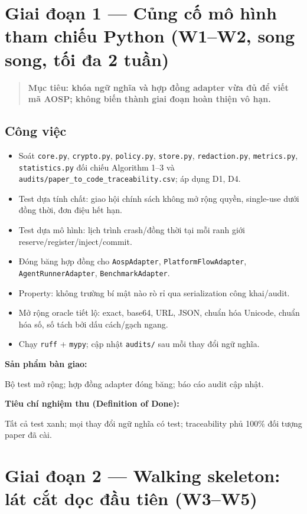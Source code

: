 \documentclass[11pt,a4paper]{article}
\newcommand{\code}[1]{\texttt{\small #1}}
\newenvironment{phasebox}
  {\begin{quote}\color{shblue}\bfseries}
  {\end{quote}}
\newcommand{\dod}[1]{\par\vspace{0.3em}\noindent\textbf{\color{shgreen}Tiêu chí nghiệm thu (Definition of Done):}\par\vspace{0.2em}\noindent #1}
\newcommand{\deliverable}[1]{\par\vspace{0.3em}\noindent\textbf{\color{shblue}Sản phẩm bàn giao:}\par\vspace{0.2em}\noindent #1}
\begin{document}
\section{Giai đoạn 1 --- Củng cố mô hình tham chiếu Python (W1--W2, song song, tối đa 2 tuần)}

\begin{phasebox}Mục tiêu: khóa ngữ nghĩa và hợp đồng adapter vừa đủ để viết mã AOSP; không biến thành giai đoạn hoàn thiện vô hạn.\end{phasebox}

\subsection{Công việc}

\begin{itemize}
  \item Soát \code{core.py}, \code{crypto.py}, \code{policy.py}, \code{store.py}, \code{redaction.py}, \code{metrics.py}, \code{statistics.py} đối chiếu Algorithm 1--3
        và \code{audits/paper\_to\_code\_traceability.csv}; áp dụng D1, D4.
  \item Test dựa tính chất: giao hội chính sách không mở rộng quyền, single-use dưới đồng thời, đơn điệu hết hạn.
  \item Test dựa mô hình: lịch trình crash/đồng thời tại mỗi ranh giới reserve/register/inject/commit.
  \item Đóng băng hợp đồng cho \code{Aosp\allowbreak Adapter}, \code{Platform\allowbreak Flow\allowbreak Adapter}, \code{Agent\allowbreak Runner\allowbreak Adapter}, \code{Benchmark\allowbreak Adapter}.
  \item Property: không trường bí mật nào rò rỉ qua serialization công khai/audit.
  \item Mở rộng oracle tiết lộ: exact, base64, URL, JSON, chuẩn hóa Unicode, chuẩn hóa số, số tách bởi dấu cách/gạch ngang.
  \item Chạy \code{ruff} + \code{mypy}; cập nhật \code{audits/} sau mỗi thay đổi ngữ nghĩa.
\end{itemize}

\deliverable{Bộ test mở rộng; hợp đồng adapter đóng băng; báo cáo audit cập nhật.}

\dod{Tất cả test xanh; mọi thay đổi ngữ nghĩa có test; traceability phủ 100\% đối tượng paper đã cài.}

\section{Giai đoạn 2 --- Walking skeleton: lát cắt dọc đầu tiên (W3--W5)}
\end{document}
